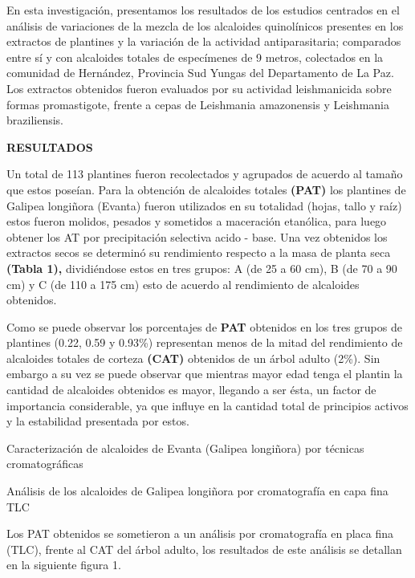 \documentclass{article}
\begin{document}
En esta investigación, presentamos los resultados de los estudios centrados en
el análisis de variaciones de la mezcla de los alcaloides quinolínicos presentes
en los extractos de plantines y la variación de la actividad antiparasitaria;
comparados entre sí y con alcaloides totales de especímenes de 9 metros,
colectados en la comunidad de Hernández, Provincia Sud Yungas del Departamento
de La Paz. Los extractos obtenidos fueron evaluados por su actividad
leishmanicida sobre formas promastigote, frente a cepas de Leishmania
amazonensis y Leishmania braziliensis.

\textbf{RESULTADOS}

Un total de 113 plantines fueron recolectados y agrupados de acuerdo al tamaño
que estos poseían. Para la obtención de alcaloides totales \textbf{(PAT) }
los plantines de Galipea longiñora (Evanta) fueron utilizados en su totalidad
(hojas, tallo y raíz) estos fueron molidos, pesados y sometidos a maceración
etanólica, para luego obtener los AT por precipitación selectiva acido - base.
Una vez obtenidos los extractos secos se determinó su rendimiento respecto a la
masa de planta seca \textbf{(Tabla 1), }
dividiéndose estos en tres grupos: A (de 25 a 60 cm), B (de 70 a 90 cm) y C (de
110 a 175 cm) esto de acuerdo al rendimiento de alcaloides obtenidos.

Como se puede observar los porcentajes de \textbf{PAT }
obtenidos en los tres grupos de plantines (0.22, 0.59 y 0.93\%) representan
menos de la mitad del rendimiento de alcaloides totales de corteza \textbf{(CAT)
}
obtenidos de un árbol adulto (2\%). Sin embargo a su vez se puede observar que
mientras mayor edad tenga el plantin la cantidad de alcaloides obtenidos es
mayor, llegando a ser ésta, un factor de importancia considerable, ya que
influye en la cantidad total de principios activos y la estabilidad presentada
por estos.

Caracterización de alcaloides de Evanta (Galipea longiñora) por técnicas
cromatográficas

Análisis de los alcaloides de Galipea longiñora por cromatografía en capa fina
TLC

Los PAT obtenidos se sometieron a un análisis por cromatografía en placa fina
(TLC), frente al CAT del árbol adulto, los resultados de este análisis se
detallan en la siguiente figura 1.

\begin{Center}
\end{Center}

\begin{Center}
\end{Center}
\end{document}
